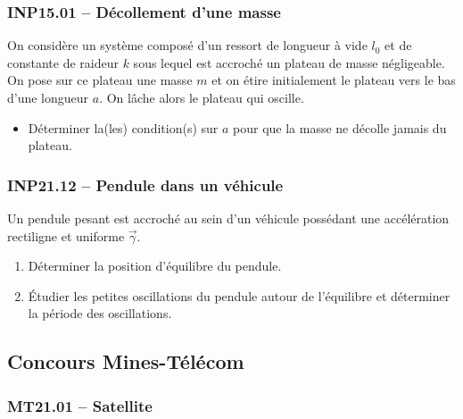 \subsubsection*{INP15.01 -- Décollement d'une masse }

On considère un système composé d'un ressort de longueur à vide $l_0$ et de constante de raideur $k$ sous lequel est accroché un plateau de masse négligeable. On pose sur ce plateau une masse $m$ et on étire initialement le plateau vers le bas d'une longueur $a$. On lâche alors le plateau qui oscille.

\begin{itemize}[label=\textbullet]
    \item Déterminer la(les) condition(s) sur $a$ pour que la masse ne décolle jamais du plateau.
\end{itemize}

\subsubsection*{INP21.12 -- Pendule dans un véhicule  \corrige}

Un pendule pesant est accroché au sein d'un véhicule possédant une accélération rectiligne et uniforme $\overrightarrow{\gamma}$.

\begin{enumerate}
    \item Déterminer la position d'équilibre du pendule.
    \item Étudier les petites oscillations du pendule autour de l'équilibre et déterminer la période des oscillations.
\end{enumerate}

\newpage
\subsection*{Concours Mines-Télécom}
\subsubsection*{MT21.01 -- Satellite  \corrige}

